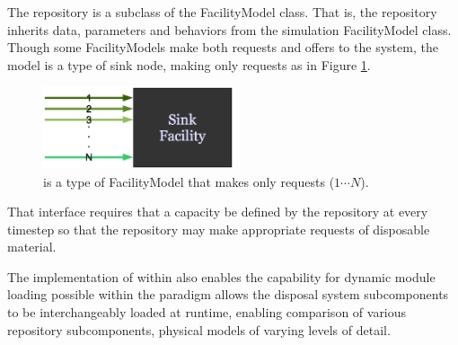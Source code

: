 The \Cyder repository is a subclass of the FacilityModel class.  That is, the 
repository inherits data, parameters and behaviors from the \Cyclus simulation 
FacilityModel class.  Though some FacilityModels make both requests and offers to the system, the \Cyder model is a type of sink node, making only requests as in Figure \ref{fig:sinkfacility}.

\begin{figure}[htb!]
  \begin{center}
    \includegraphics[width=0.5\textwidth]{./chapters/paradigm/sinkfacility.eps}
  \end{center}
  \caption[\Cyder request-only interface.]{\Cyder is a type of \Cyclus FacilityModel that makes only requests 
  ($1\cdots N$).}
  \label{fig:sinkfacility}
\end{figure}

That interface requires that a capacity be defined by the repository at every 
\Cyclus timestep so that the repository may make appropriate requests of 
disposable material.  

The implementation of \Cyder within \Cyclus also enables the capability for 
dynamic module loading possible within the \Cyclus paradigm allows the disposal 
system subcomponents to be interchangeably loaded at runtime, enabling 
comparison of various repository subcomponents, physical models of varying 
levels of detail.  



